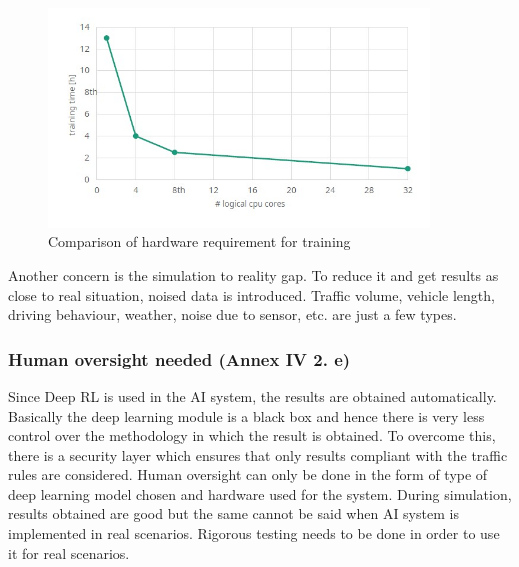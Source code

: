 \begin{figure}[h]
        \includegraphics[width=0.9\textwidth]{paper-template/figs/trainingdata.jpg}
        \caption{Comparison of hardware requirement for training}
        \label{fig:my_label}
        \end{figure} \newline
Another concern is the simulation to reality gap. To reduce it and get results as close to real situation, noised data is introduced. Traffic volume, vehicle length, driving behaviour, weather, noise due to sensor, etc.  are just a few types. 
  \subsubsection{Human oversight needed (Annex IV 2. e)}
  Since Deep RL is used in the AI system, the results are obtained automatically. Basically the deep learning module is a black box and hence there is very less control over the methodology in which the result is obtained. To overcome this, there is a security layer which ensures that only results compliant with the traffic rules are considered. Human oversight can only be done in the form of type of deep learning model chosen and hardware used for the system. During simulation, results obtained are good but the same cannot be said when AI system is implemented in real scenarios. Rigorous testing needs to be done in order to use it for real scenarios.
